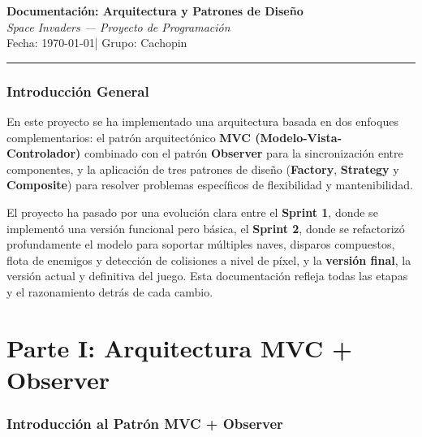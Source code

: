 \documentclass[12pt, a4paper]{article}
\begin{document}
 
\begin{center}
    {\LARGE \textbf{Documentaci\'{o}n: Arquitectura y Patrones de Dise\~{n}o}}\\[0.4em]
    {\large \textit{Space Invaders --- Proyecto de Programaci\'{o}n}}\\[0.3em]
    {\small Fecha: \today \quad | \quad Grupo: Cachopin}
\end{center}
 
\vspace{0.5em}
\hrule
\vspace{1.5em}
 
\tableofcontents
\newpage
 
\section{Introducci\'{o}n General}
 
En este proyecto se ha implementado una arquitectura basada en dos enfoques complementarios: el patr\'{o}n arquitect\'{o}nico \textbf{MVC (Modelo-Vista-Controlador)} combinado con el patr\'{o}n \textbf{Observer} para la sincronizaci\'{o}n entre componentes, y la aplicaci\'{o}n de tres patrones de dise\~{n}o (\textbf{Factory}, \textbf{Strategy} y \textbf{Composite}) para resolver problemas espec\'{i}ficos de flexibilidad y mantenibilidad.
 
El proyecto ha pasado por una evoluci\'{o}n clara entre el \textbf{Sprint 1}, donde se implement\'{o} una versi\'{o}n funcional pero b\'{a}sica, el \textbf{Sprint 2}, donde se refactoriz\'{o} profundamente el modelo para soportar m\'{u}ltiples naves, disparos compuestos, flota de enemigos y detecci\'{o}n de colisiones a nivel de p\'{i}xel, y la \textbf{versi\'{o}n final}, la versi\'{o}n actual y definitiva del juego. Esta documentaci\'{o}n refleja todas las etapas y el razonamiento detr\'{a}s de cada cambio.
 
\newpage
 
\part*{Parte I: Arquitectura MVC + Observer}
 
\section{Introducci\'{o}n al Patr\'{o}n MVC + Observer}
 
\end{document}
